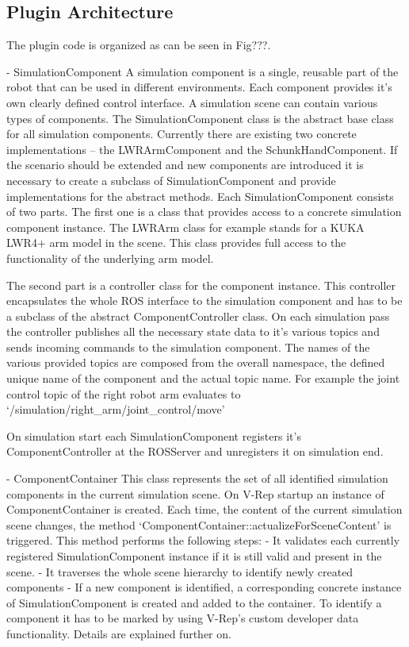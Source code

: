 \subsection{Plugin Architecture}
The plugin code is organized as can be seen in Fig???.

- SimulationComponent
  A simulation component is a single, reusable part of the robot that can be used in different
  environments. Each component provides it's own clearly defined control interface. A simulation
  scene can contain various types of components. The SimulationComponent class is the abstract
  base class for all simulation components. Currently there are existing two concrete implementations
  -- the LWRArmComponent and the SchunkHandComponent. If the scenario should be extended and new
  components are introduced it is necessary to create a subclass of SimulationComponent and provide
  implementations for the abstract methods. Each SimulationComponent consists of two parts. The first 
  one is a class that provides access to a concrete simulation component instance. The LWRArm class
  for example stands for a KUKA LWR4+ arm model in the scene. This class provides full access to the
  functionality of the underlying arm model.
  
  The second part is a controller class for the component instance. This controller encapsulates the
  whole ROS interface to the simulation component and has to be a subclass of the abstract 
  ComponentController class. On each simulation pass the controller publishes all the necessary
  state data to it's various topics and sends incoming commands to the simulation component. The
  names of the various provided topics are composed from the overall namespace, the defined unique
  name of the component and the actual topic name. For example the joint control topic of the right
  robot arm evaluates to `/simulation/right\_arm/joint\_control/move'
  
  On simulation start each SimulationComponent registers it's ComponentController at the ROSServer
  and unregisters it on simulation end.
  
- ComponentContainer
  This class represents the set of all identified simulation components in the current simulation
  scene. On V-Rep startup an instance of ComponentContainer is created. Each time, the content of
  the current simulation scene changes, the method `ComponentContainer::actualizeForSceneContent' 
  is triggered. This method performs the following steps:
  - It validates each currently registered SimulationComponent instance if it is still valid and
    present in the scene.
  - It traverses the whole scene hierarchy to identify newly created components
  - If a new component is identified, a corresponding concrete instance of SimulationComponent 
    is created and added to the container.
  To identify a component it has to be marked by using V-Rep's custom developer data functionality.
  Details are explained further on.
  
